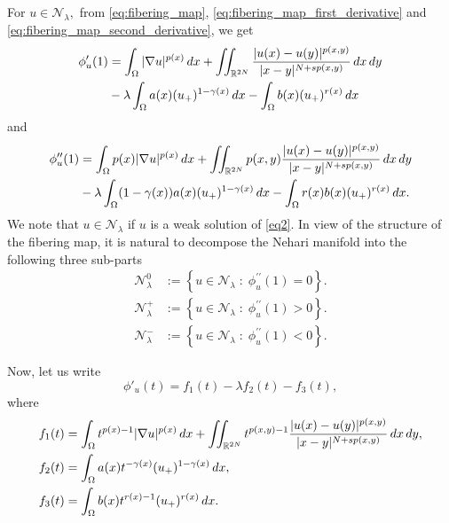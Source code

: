 \documentclass[11pt]{article}
\newcommand{\Nh}{\mathcal{N}_\la}
\newcommand{\la} {\lambda}
\newcommand{\ds} {\displaystyle}
\begin{document}
For $u\in \Nh,$
from \eqref{eq:fibering_map}, 
\eqref{eq:fibering_map_first_derivative} and 
\eqref{eq:fibering_map_second_derivative}, we get
\begin{align} \label{eq:first_derivative} 
\phi_u'(1) 
& = 
\int_{\Omega}|\nabla u|^{p(x)} \, dx 
 +\iint_{\mathbb{R}^{2N}}
\frac{|u(x) - u(y)|^{p(x,y)}}{|x - y|^{N + sp(x,y)}}
 \, dx \, dy   \\ \notag
&  - \lambda 
\int_{\Omega} a(x) (u_+)^{1 - \gamma(x)} \, dx 
- 
\int_{\Omega}b(x) (u_+)^{r(x)} \, dx
\end{align}
and 
\begin{align}\label{eq:second_derivative} 
\phi_u''(1) 
& = 
\int_{\Omega} p(x)|\nabla u|^{p(x)}  \, dx 
+ \iint_{\mathbb{R}^{2N}} p(x,y)
\frac{|u(x) - u(y)|^{p(x,y)}}
{|x - y|^{N + sp(x,y)}} \, dx \, dy   \\ \notag
& - \lambda 
\int_{\Omega} (1-\gamma(x)) 
a(x)(u_+)^{1 - \gamma(x)} \, dx 
- 
\int_{\Omega} r(x)b(x)(u_+)^{r(x)} \, dx.
\end{align}
We note that $u\in\Nh$
if $u$
is a weak solution of \eqref{eq2}.
In view of the structure of the fibering map, 
it is natural to decompose the Nehari 
manifold into the following three sub-parts 
\begin{align*}
    \mathcal{N}_{\lambda}^{0} 
    &:= \left\{ u \in \mathcal{N}_{\la} \;:\; 
    \phi^{\prime \prime}_{u}(1) = 0 \right\}.\\
    \mathcal{N}_{\lambda}^{+} 
    &:= \left\{ u \in \mathcal{N}_{\la} \;:\; 
    \phi^{\prime \prime}_{u}(1) > 0 \right\}.\\
    \mathcal{N}_{\lambda}^{-} 
    &:= \left\{ u \in \mathcal{N}_{\la} \;:\; 
    \phi^{\prime \prime}_{u}(1) < 0 \right\}.
\end{align*}

 

 Now, let us write
\begin{equation}\label{fibermap_derivative_f_i}
\phi'_u(t) = f_1(t) - \lambda f_2(t) - f_3(t) ,
\end{equation}
where
\begin{align}\label{functions}
 &  f_1(t) = \ds
\int_{\Omega} t^{p(x)-1} |\nabla u|^{p(x)} \, dx 
+ \iint_{\mathbb{R}^{2N}} t^{p(x,y)-1}
\frac{|u(x)-u(y)|^{p(x,y)}}
{|x - y|^{N + sp(x,y)}}\, dx \, dy,    \notag \\
&   f_2(t) = \ds
\int_{\Omega} a(x)t^{-\gamma(x)}(u_+)^{1 - \gamma(x)}
 \, dx,   \\ \notag
 &
 f_3(t) = \ds
\int_{\Omega} b(x) t^{r(x)-1} (u_+)^{r(x)} \, dx.
 \end{align}
\end{document}
